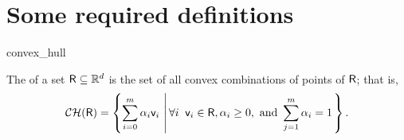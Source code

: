 \section{Some required definitions}
\begin{fragment}{convex_hull}
    \begin{defn}
        The  of a set ${{\mathsf{R}}} \subseteq
        \mathbb{R}^d$ is the set of all convex combinations of points of
        ${{\mathsf{R}}}$; that is,
        \[
        \CHX{ \PntSetC} = \brc{\sum_{i=0}^m \alpha_i \pntB_i\sep{
              \forall i \;\;\pntB_i \in \PntSetC, \alpha_i \geq 0,
              \text{ and } \sum_{j=1}^m \alpha_i =1}}.
        \]
    \end{defn}
\end{fragment}




   

\StandAloneMode{
   
%
}



\ChapterEnd{}

% 
  

